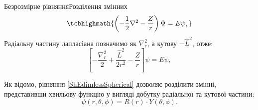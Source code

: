 \documentclass[]{beamer}
\begin{document}
\begin{frame}{Безрозмірне рівняння}{Розділення змінних}
\begin{equation*}\label{ShEdimless}
	\tcbhighmath{\left( -\frac12\nabla^2 - \frac{Z}{r}\right) \Psi = E\psi,}
\end{equation*}
	Радіальну частину лапласіана позначимо як $\nabla^2_{r}$, а кутову $ -\hat L^2$, отже:
	\begin{equation}\label{ShEdimlessSpherical}
		\left[ -\frac{\nabla_{r}^2}{2} + \frac{\hat L^2}{2r^2}  - \frac{Z}{r}\right] \psi = E\psi,
	\end{equation}

	Як відомо, рівняння \eqref{ShEdimlessSpherical} дозволяє розділити змінні, представивши хвильову функцію у вигляді добутку радіальної та кутової частини:
	\begin{equation}\label{Psi}
		\psi (r,\theta,\phi) = R(r) \cdot Y(\theta,\phi ).
	\end{equation}
\end{frame}
\end{document}

